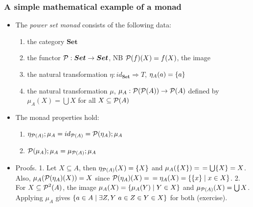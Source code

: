 \documentclass[handout]{beamer}
\newcommand{\To}{\Rightarrow}
\newcommand{\bfsf}[1]{{\boldsymbol{#1}}}
\newcommand{\Set}{\bfsf{Set}}
\begin{document}
\frame
  {   
    \frametitle{A simple mathematical example of a monad}\label{Mon5:PowSetMonad}

 \begin{itemize}[<+->]
\item The \emph{power set monad} consists of the following data:
 \begin{enumerate}
    \item the category $\Set$
    \item the functor $\powset:\Set\to\Set$, NB $\operatorname{\mathcal{P}}(f)(X) = f(X)$, the {\color{red}image}
    \item the natural transformation $\eta: id_\Set \To T$, $\eta_A(a)=\{a\}$
    \item the natural transformation $\mu$, 
$\mu_A: \operatorname{\mathcal{P}}(\operatorname{\mathcal{P}}(A)) \to \operatorname{\mathcal{P}}(A) $ defined by 
$\mu_A(X) = \bigcup X$ for all $X\subseteq\operatorname{\mathcal{P}}(A)$
 \end{enumerate}
\item The monad properties hold:
 \begin{enumerate}
    \item $\eta_{\operatorname{\mathcal{P}}(A)};\mu_A = id_{\operatorname{\mathcal{P}}(A)} = \operatorname{\mathcal{P}}(\eta_A);\mu_A$
    \item $\operatorname{\mathcal{P}}(\mu_A);\mu_A = \mu_{\operatorname{\mathcal{P}}(A)};\mu_A$
 \end{enumerate}
\item Proofs. 1. Let $X\subseteq A$, then $\eta_{\operatorname{\mathcal{P}}(A)}(X) = \{X\}$
and $\mu_A(\{X\}) = $ $ =\bigcup\{X\} = X$. 
Also, $\mu_A(\operatorname{\mathcal{P}}(\eta_A)(X)) = X$
since $\operatorname{\mathcal{P}}(\eta_A)(X)=$ $=\eta_A(X)=\{\{x\} \mid x\in X\}$. 
2. For $X\subseteq \operatorname{\mathcal{P}}^2(A)$, the {\color{red}image} 
$\mu_A(X) = \{\mu_A(Y)\mid Y\in X\}$
and $\mu_{\operatorname{\mathcal{P}}(A)}(X)=\bigcup X$. Applying $\mu_A$ gives
$\{a\in A \mid \exists Z,Y~a\in Z\in Y \in X\}$ for both (exercise).
 \end{itemize}

 }
\end{document}
